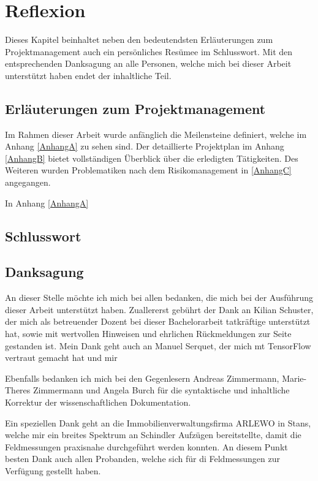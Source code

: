 \chapter{Reflexion}
\label{chap:Reflexion}

Dieses Kapitel beinhaltet neben den bedeutendsten Erläuterungen zum Projektmanagement auch ein persönliches Resümee im Schlusswort. Mit den entsprechenden Danksagung an alle Personen, welche mich bei dieser Arbeit unterstützt haben endet der inhaltliche Teil.


\section{Erläuterungen zum Projektmanagement}
Im Rahmen dieser Arbeit wurde anfänglich die Meilensteine definiert, welche im Anhang \ref{AnhangA} zu sehen sind. Der detaillierte Projektplan im Anhang \ref{AnhangB} bietet vollständigen Überblick über die erledigten Tätigkeiten. Des Weiteren wurden Problematiken nach dem Risikomanagement in \ref{AnhangC} angegangen.

In Anhang \ref{AnhangA}



 


\section{Schlusswort}



\section{Danksagung}

An dieser Stelle möchte ich mich bei allen bedanken, die mich bei der Ausführung dieser
Arbeit unterstützt haben. 
Zuallererst gebührt der Dank an Kilian Schuster, der mich als betreuender Dozent bei dieser Bachelorarbeit tatkräftige unterstützt hat, sowie mit wertvollen Hinweisen und ehrlichen Rückmeldungen zur Seite gestanden ist. Mein Dank geht auch an Manuel Serquet, der mich mt TensorFlow vertraut gemacht hat und mir 

Ebenfalls bedanken ich mich bei den Gegenlesern Andreas Zimmermann, Marie-Theres Zimmermann
und Angela Burch für die syntaktische und inhaltliche Korrektur der wissenschaftlichen
Dokumentation.

Ein speziellen Dank geht an die Immobilienverwaltungsfirma ARLEWO in Stans, welche mir ein breites Spektrum an Schindler Aufzügen bereitstellte, damit die Feldmessungen praxisnahe durchgeführt werden konnten. An diesem Punkt besten Dank auch allen Probanden, welche sich für di Feldmessungen zur Verfügung gestellt haben.